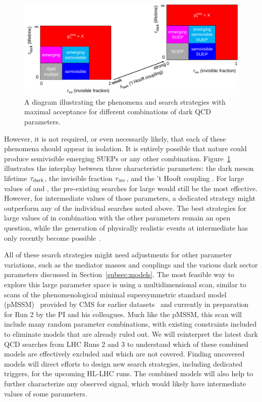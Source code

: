 \begin{figure}[bht]
\centering
\includegraphics[width=0.95\myfigurewidth]{figures/svj_acceptance_diagram_v7.pdf}
\caption{A diagram illustrating the phenomena and search strategies with maximal acceptance for different combinations of dark QCD parameters.}
\label{fig:svjacc}
\end{figure}

However, it is not required, or even necessarily likely, that each of these phenomena should appear in isolation.
It is entirely possible that nature could produce semivisible emerging SUEPs or any other combination.
Figure~\ref{fig:svjacc} illustrates the interplay between three characteristic parameters:
the dark meson lifetime $\tau_\text{dark}$, the invisible fraction $r_{\mathrm{inv}}$, and the 't Hooft coupling \thooft.
For large values of \rinv and \taudark, the pre-existing searches for large \met would still be the most effective.
However, for intermediate values of those parameters, a dedicated strategy might outperform any of the individual searches noted above.
The best strategies for large values of \thooft in combination with the other parameters remain an open question,
while the generation of physically realistic events at intermediate \thooft has only recently become possible~\cite{Cesarotti:2020uod}.

All of these search strategies might need adjustments for other parameter variations,
such as the mediator masses and couplings and the various dark sector parameters discussed in Section~\ref{subsec:models}.
The most feasible way to explore this large parameter space is using a multidimensional scan,
similar to scans of the phenomenological minimal supersymmetric standard model (pMSSM)~\cite{Djouadi:1998di}
provided by CMS for earlier datasets~\cite{Khachatryan:2016nvf,SUS-16-033-supp} and currently in preparation for Run 2 by the PI and his colleagues.
Much like the pMSSM, this scan will include many random parameter combinations, with existing constraints included to eliminate models that are already ruled out.
We will reinterpret the latest dark QCD searches from LHC Runs 2 and 3 to understand which of these combined models are effectively excluded and which are not covered.
Finding uncovered models will direct efforts to design new search strategies, including dedicated triggers, for the upcoming HL-LHC runs.
The combined models will also help to further characterize any observed signal, which would likely have intermediate values of some parameters.

